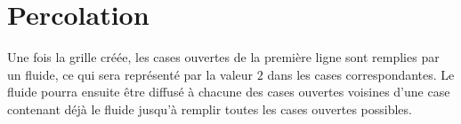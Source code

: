 %
%
%
%
%
%
%
%
%
%

%
\section*{Percolation}\label{percolation}
%




Une fois la grille créée, les cases ouvertes de la première ligne sont
remplies par un fluide, ce qui sera représenté par la valeur $2$ dans
les cases correspondantes. Le fluide pourra ensuite être diffusé à
chacune des cases ouvertes voisines d'une case contenant déjà le fluide jusqu'à remplir toutes les cases ouvertes possibles.

